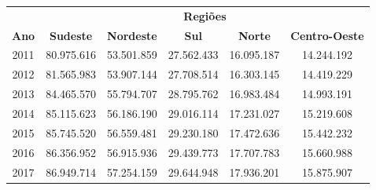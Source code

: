 \begin{table}[!ht]
    \centering
    \label{estimativas}
    \begin{tabular}{c|c|c|c|c|c}
        \hline
                     & \multicolumn{5}{c}{\textbf{Regiões}}                                                                             \\
        \cline{2-6}
        \textbf{Ano} & \textbf{Sudeste}                     & \textbf{Nordeste} & \textbf{Sul} & \textbf{Norte} & \textbf{Centro-Oeste} \\
        \hline
        2011         & 80.975.616                           & 53.501.859        & 27.562.433   & 16.095.187     & 14.244.192            \\
        \hline
        2012         & 81.565.983                           & 53.907.144        & 27.708.514   & 16.303.145     &
        14.419.229                                                                                                                      \\
        \hline
        2013         & 84.465.570                           & 55.794.707        & 28.795.762   & 16.983.484     &
        14.993.191                                                                                                                      \\
        \hline
        2014         & 85.115.623                           & 56.186.190        & 29.016.114   & 17.231.027     &
        15.219.608                                                                                                                      \\
        \hline
        2015         & 85.745.520                           & 56.559.481        & 29.230.180   & 17.472.636     &
        15.442.232                                                                                                                      \\
        \hline
        2016         & 86.356.952                           & 56.915.936        & 29.439.773   & 17.707.783     &
        15.660.988                                                                                                                      \\
        \hline
        2017         & 86.949.714                           & 57.254.159        & 29.644.948   & 17.936.201     &
        15.875.907                                                                                                                      \\
        \hline
    \end{tabular}
\end{table}

